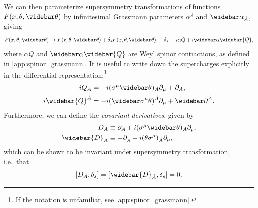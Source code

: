 We can then parameterize supersymmetry transformations of functions $F(x,\theta,\thetabar)$ by infinitesimal Grassmann parameters $\alpha^A$ and $\widebar\alpha_{\dot{A}}$, giving
\begin{equation}\label{eq:susy_transformation}
    F(x,\theta,\thetabar) \to F(x,\theta,\thetabar) + \delta_s F(x,\theta,\thetabar),
    \quad
    \delta_s \equiv i\alpha Q + i\widebar\alpha\widebar{Q},
\end{equation}
where $\alpha Q$ and $\widebar\alpha\widebar{Q}$ are Weyl spinor contractions, as defined in \cref{app:spinor_grassmann}.
It is useful to write down the supercharges explicitly in the differential representation:\footnote{If the notation is unfamiliar, see \cref{app:spinor_grassmann}.}
\begin{subequations}
\label{eq:supercharge_differential}
\begin{align}
    iQ_A &= -i(\sigma^\mu\thetabar)_A \partial_\mu + \partial_A,
    \\
    i\widebar{Q}^{\dot{A}} &= -i(\widebar\sigma^\mu\theta)^{\dot{A}} \partial_\mu + \widebar\partial^{\dot{A}}.
\end{align}
\end{subequations}
Furthermore, we can define the \emph{covariant derivatives}, given by~\cite{IntrSUSY2010}
\begin{subequations}
\begin{align}
    D_A &\equiv \partial_A + i(\sigma^\mu\thetabar)_A\partial_\mu,
    \\
    \widebar{D}_{\dot{A}} &\equiv -\partial_{\dot{A}} - i(\theta\sigma^\mu)_{\dot{A}}\partial_\mu,
\end{align}
\end{subequations}
which can be shown to be invariant under supersymmetry transformation, i.e.\ that~\cite[p.~264--267]{IntrSUSY2010}
\begin{equation}\label{eq:covariant_susy_commute}
    [D_A, \delta_s] = [\widebar{D}_{\dot{A}},\delta_s] = 0.
\end{equation}


